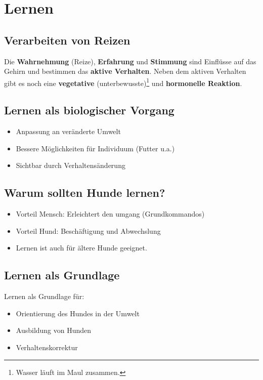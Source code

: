 \section{Lernen}

    \subsection{Verarbeiten von Reizen}
        Die \textbf{Wahrnehmung} (Reize), \textbf{Erfahrung} und \textbf{Stimmung} sind Einflüsse auf das Gehirn und bestimmen das \textbf{aktive Verhalten}.
        Neben dem aktiven Verhalten gibt es noch eine \textbf{vegetative} (unterbewusste)\footnote{Wasser läuft im Maul zusammen.} und \textbf{hormonelle Reaktion}.

    \subsection{Lernen als biologischer Vorgang}
        \begin{itemize}
            \item Anpassung an veränderte Umwelt
            \item Bessere Möglichkeiten für Individuum (Futter u.a.)
            \item Sichtbar durch Verhaltensänderung
        \end{itemize}

    \subsection{Warum sollten Hunde lernen?}
        \begin{itemize}
            \item Vorteil Mensch: Erleichtert den umgang (Grundkommandos)
            \item Vorteil Hund: Beschäftigung und Abwechslung
            \item Lernen ist auch für ältere Hunde geeignet.
        \end{itemize}

    \subsection{Lernen als Grundlage}
        Lernen als Grundlage für:
        \begin{itemize}
            \item Orientierung des Hundes in der Umwelt
            \item Ausbildung von Hunden
            \item Verhaltenskorrektur
        \end{itemize}

